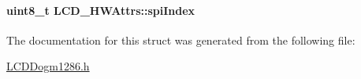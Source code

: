 \paragraph[{spi\-Index}]{\setlength{\rightskip}{0pt plus 5cm}uint8\-\_\-t L\-C\-D\-\_\-\-H\-W\-Attrs\-::spi\-Index}\label{struct_l_c_d___h_w_attrs_aad817df3726cc746fd22075f4510e9d6}


The documentation for this struct was generated from the following file\-:\begin{DoxyCompactItemize}
\item 
\hyperlink{_l_c_d_dogm1286_8h}{L\-C\-D\-Dogm1286.\-h}\end{DoxyCompactItemize}
